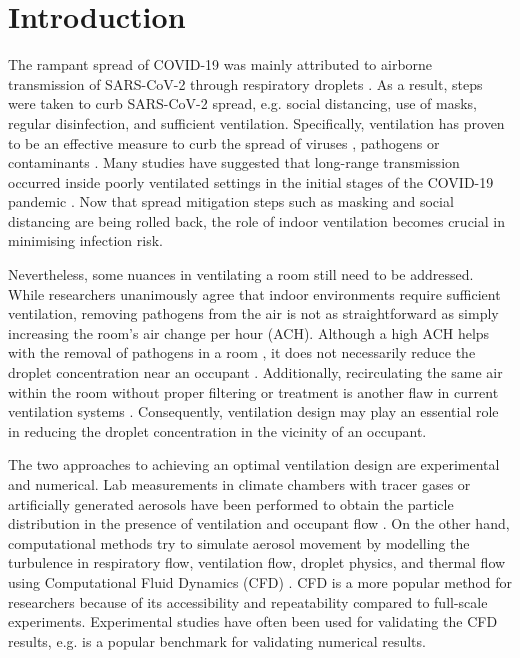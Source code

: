 \documentclass[preprint,12pt]{elsarticle}
\begin{document}

\section{Introduction}
\label{sec:sample1}
The rampant spread of COVID-19 was mainly attributed to airborne transmission of SARS-CoV-2 through respiratory droplets \cite{morawska2020airborne}. As a result, steps were taken to curb SARS-CoV-2 spread, e.g. social distancing, use of masks, regular disinfection, and sufficient ventilation. Specifically, ventilation has proven to be an effective measure to curb the spread of viruses \cite{ren2021numerical}, pathogens \cite{berrouk2010experimental} or contaminants \cite{li2020investigating}. Many studies have suggested that long-range transmission occurred inside poorly ventilated settings in the initial stages of the COVID-19 pandemic \cite{morawska2020can,li2021probable, liu2021simulation}. Now that spread mitigation steps such as masking and social distancing are being rolled back, the role of indoor ventilation becomes crucial in minimising infection risk.

Nevertheless, some nuances in ventilating a room still need to be addressed. While researchers unanimously agree that indoor environments require sufficient ventilation, removing pathogens from the air is not as straightforward as simply increasing the room's air change per hour (ACH). Although a high ACH helps with the removal of pathogens in a room \cite{guo2022visualization, ho2021modeling}, it does not necessarily reduce the droplet concentration near an occupant \cite{arpino2023cfd}. Additionally, recirculating the same air within the room without proper filtering or treatment is another flaw in current ventilation systems \cite{li2021probable}. Consequently, ventilation design may play an essential role in reducing the droplet concentration in the vicinity of an occupant. 

The two approaches to achieving an optimal ventilation design are experimental and numerical. Lab measurements in climate chambers with tracer gases or artificially generated aerosols have been performed to obtain the particle distribution in the presence of ventilation and occupant flow \cite{zhou2021experimental}. On the other hand, computational methods try to simulate aerosol movement by modelling the turbulence in respiratory flow, ventilation flow, droplet physics, and thermal flow using Computational Fluid Dynamics (CFD) \cite{wang2022evaluation}. CFD is a more popular method for researchers because of its accessibility and repeatability compared to full-scale experiments. Experimental studies have often been used for validating the CFD results, e.g. \cite{yin2009experimental} is a popular benchmark for validating numerical results.
\end{document}
